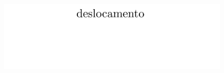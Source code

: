 \begin{figure}[!htbp]
	{\includegraphics[scale=0.015,trim=0cm 20.0cm 0cm 0cm, clip=true]{Imagens/Cap4/casca_legenda.pdf}}
	\label{fig:casca_campos_deslocamentos}
\end{figure}